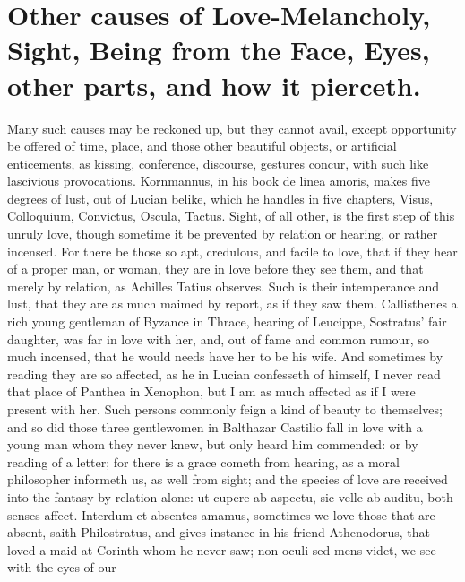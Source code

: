 {%
\section[Other causes of Love-Melancholy]{Other causes of Love-Melancholy, Sight, Being from the Face, Eyes, other parts, and how it pierceth.}

Many such causes may be reckoned up, but they cannot avail, except
opportunity be offered of time, place, and those other beautiful
objects, or artificial enticements, as kissing, conference, discourse,
gestures concur, with such like lascivious provocations. Kornmannus, in
his book de linea amoris, makes five degrees of lust, out of
Lucian belike, which he handles in five chapters, Visus,
Colloquium, Convictus, Oscula, Tactus. Sight, of all other, is
the first step of this unruly love, though sometime it be prevented by
relation or hearing, or rather incensed. For there be those so apt,
credulous, and facile to love, that if they hear of a proper man, or
woman, they are in love before they see them, and that merely by
relation, as Achilles Tatius observes. Such is their intemperance
and lust, that they are as much maimed by report, as if they saw them.
Callisthenes a rich young gentleman of Byzance in Thrace, hearing of
Leucippe, Sostratus' fair daughter, was far in love with her,
and, out of fame and common rumour, so much incensed, that he would
needs have her to be his wife. And sometimes by reading they are so
affected, as he in Lucian confesseth of himself, I never read
that place of Panthea in Xenophon, but I am as much affected as if I
were present with her. Such persons commonly feign a kind of
beauty to themselves; and so did those three gentlewomen in
Balthazar Castilio fall in love with a young man whom they never
knew, but only heard him commended: or by reading of a letter; for
there is a grace cometh from hearing,  as a moral philosopher
informeth us, as well from sight; and the species of love are received
into the fantasy by relation alone: ut cupere ab aspectu, sic
velle ab auditu, both senses affect. Interdum et absentes amamus,
sometimes we love those that are absent, saith Philostratus, and gives
instance in his friend Athenodorus, that loved a maid at Corinth whom
he never saw; non oculi sed mens videt, we see with the eyes of our
}

